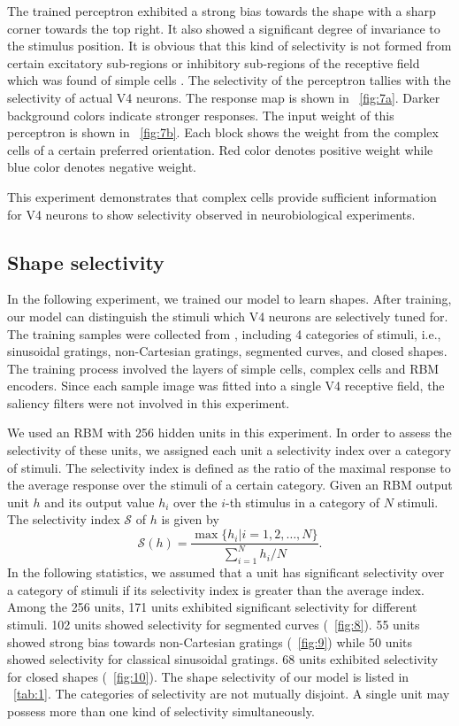 \documentclass[twocolumn]{article}
\begin{document}
The trained perceptron exhibited a strong bias towards the shape with a sharp corner towards the top right.
It also showed a significant degree of invariance to the stimulus position.
It is obvious that this kind of selectivity is not formed from certain excitatory sub-regions
or inhibitory sub-regions of the receptive field which was found of simple cells \cite{hubel1962,pasupathy2001}.
The selectivity of the perceptron tallies with the selectivity of actual V4 neurons.
The response map is shown in \figurename~\ref{fig:7a}.
Darker background colors indicate stronger responses.
The input weight of this perceptron is shown in \figurename~\ref{fig:7b}.
Each block shows the weight from the complex cells of a certain preferred orientation.
Red color denotes positive weight while blue color denotes negative weight.

This experiment demonstrates that complex cells provide sufficient information for V4 neurons to show selectivity observed in neurobiological experiments.

\subsection{Shape selectivity}

In the following experiment, we trained our model to learn shapes.
After training, our model can distinguish the stimuli which V4 neurons are selectively tuned for.
The training samples were collected from \cite{gallant1996,pasupathy1999,pasupathy2001}, 
including 4 categories of stimuli, i.e., sinusoidal gratings, non-Cartesian gratings, segmented curves, and closed shapes.
The training process involved the layers of simple cells, complex cells and RBM encoders.
Since each sample image was fitted into a single V4 receptive field, the saliency filters were not involved in this experiment.

We used an RBM with 256 hidden units in this experiment.
In order to assess the selectivity of these units, we assigned each unit a selectivity index over a category of stimuli.
The selectivity index is defined as the ratio of the maximal response to the average response over the stimuli of a certain category.
Given an RBM output unit $h$ and its output value $h_i$ over the $i$-th stimulus in a category of $N$ stimuli.
The selectivity index $\mathcal{S}$ of $h$ is given by
\begin{equation}
\mathcal{S}(h)=\frac{\max\{h_i|i=1,2,\dots,N\}}{\sum_{i=1}^N h_i/N}.
\end{equation}
In the following statistics, we assumed that a unit has significant selectivity over a category of stimuli
if its selectivity index is greater than the average index.
Among the 256 units, 171 units exhibited significant selectivity for different stimuli.
102 units showed selectivity for segmented curves (\figurename~\ref{fig:8}).
55 units showed strong bias towards non-Cartesian gratings (\figurename~\ref{fig:9})
while 50 units showed selectivity for classical sinusoidal gratings.
68 units exhibited selectivity for closed shapes (\figurename~\ref{fig:10}).
The shape selectivity of our model is listed in \tablename~\ref{tab:1}.
The categories of selectivity are not mutually disjoint.
A single unit may possess more than one kind of selectivity simultaneously.
\end{document}
